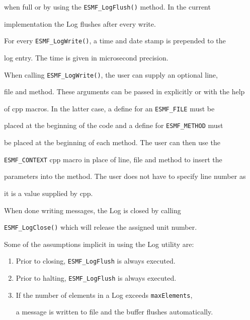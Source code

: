 when full or by using the {\tt ESMF\_LogFlush()} method.  In the current

implementation the Log flushes after every write.  


For every {\tt ESMF\_LogWrite()}, a time and date stamp is prepended to the

log entry.  The time is given in microsecond precision.


When calling {\tt ESMF\_LogWrite()}, the user can supply an optional line,

file and method.  These arguments can be passed in explicitly or with the help

of cpp macros.  In the latter case, a define for an {\tt ESMF\_FILE} must be 

placed at the beginning of the code and a define for {\tt ESMF\_METHOD} must

be placed at the beginning of each method.  The user can then use the

{\tt ESMF\_CONTEXT} cpp macro in place of line, file and method to insert the 

parameters into the method.  The user does not have to specify line number as

it is a value supplied by cpp.


When done writing messages, the Log is closed by calling 

{\tt ESMF\_LogClose()} which will release the assigned unit number.


Some of the assumptions implicit in using the Log utility are:


\begin{enumerate}


\item Prior to closing, {\tt ESMF\_LogFlush} is always executed.

\item Prior to halting, {\tt ESMF\_LogFlush} is always executed.

\item If the number of elements in a Log exceeds {\tt maxElements}, 

a message is written to file and the buffer flushes automatically.


\end{enumerate}





